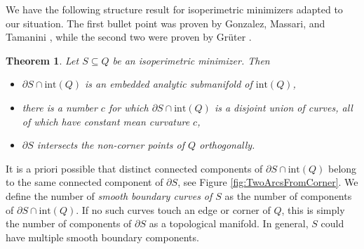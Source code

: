 \documentclass[leqno]{article}
\numberwithin{equation}{section}
\newtheorem{theorem}[equation]{Theorem}
\theoremstyle{definition}
\theoremstyle{remark}
\theoremstyle{plain}
\begin{document}
We have the following structure result for isoperimetric minimizers adapted to our situation.  The first bullet point  was proven by Gonzalez, Massari, and Tamanini \cite[Theorem 2, pg. 29]{GMT}, while the second two were proven by Grüter \cite[Theorem (iii) pg. 264]{Gr}.

\begin{theorem}
    \label{thm:structure}  
    Let $S\subseteq Q$ be an isoperimetric minimizer.  Then 
    \begin{itemize}
        \item $\partial S\cap \text{int}(Q)$ is an embedded analytic submanifold of $\text{int}(Q)$,
        \item  there is a number $c$ for which $\partial S\cap \text{int}(Q)$ is a disjoint union of curves, all of which have constant mean curvature $c$,
        \item  $\partial S$ intersects the non-corner points of $Q$ orthogonally.
    \end{itemize}
\end{theorem}

It is a priori possible that distinct connected components of $\partial S\cap \text{int}(Q)$ belong to the same connected component of $\partial S$, see Figure \ref{fig:TwoArcsFromCorner}. We define the number of \textit{smooth boundary curves of $S$} as the number of components of $\partial S\cap \text{int}(Q)$.  If no such curves touch an edge or corner of $Q$, this is simply the number of components of $\partial S$ as a topological manifold. In general, $S$ could have multiple smooth boundary components. 

\begin{center}
    \label{fig:TwoArcsFromCorner}
\end{center}
\end{document}
